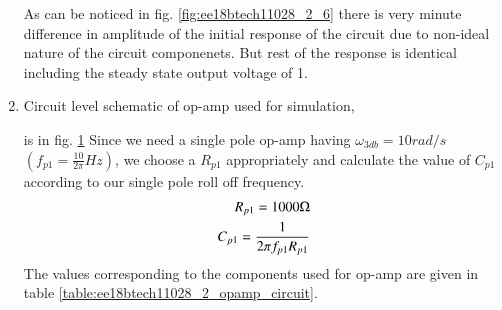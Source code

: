 \begin{enumerate}[label=\arabic*.,ref=\theenumi]
As can be noticed in fig. \ref{fig:ee18btech11028_2_6} there is very minute difference in amplitude of the initial response of the circuit due to non-ideal nature of the circuit componenets. But rest of the response is identical including the steady state output voltage of 1.
\item
Circuit level schematic of op-amp used for simulation,
\begin{figure}[!ht]
	\begin{center}
		\resizebox{4\columnwidth/5}{!}{}
	\end{center}
\caption{}
\label{fig:ee18btech11028_2_7}
\end{figure}
is in fig. \ref{fig:ee18btech11028_2_7}
Since we need a single pole op-amp having $\omega_{3db}  =  10 rad/s$  $(f_{p1} = \frac{10}{2\pi} Hz)$,
we choose a $R_{p1}$ appropriately and calculate the value of $C_{p1}$ according to our single pole roll off frequency.
\begin{align}
    R_{p1}  = 1000 \ohm
    \\
    C_{p1} = \frac{1}{2  \pi f_{p1} R_{p1}}
\end{align}
The values corresponding to the components used for op-amp are given in table \ref{table:ee18btech11028_2_opamp_circuit}. 
\begin{table}[!ht]
    \centering
    
    \caption{}
    \label{table:ee18btech11028_2_opamp_circuit}
\end{table}




\end{enumerate}